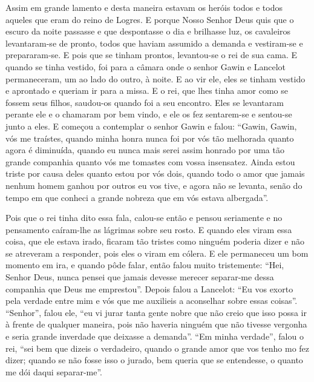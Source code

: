 Assim em grande lamento e desta maneira estavam os heróis todos e todos aqueles
que eram do reino de Logres. E porque Nosso Senhor Deus quis que o escuro da
noite passasse e que despontasse o dia e brilhasse luz, os cavaleiros
levantaram-se de pronto, todos que haviam assumido a demanda e vestiram-se e
prepararam-se. E pois que se tinham prontos, levantou-se o rei de sua cama. E
quando se tinha vestido, foi para a câmara onde o senhor Gawin e Lancelot
permaneceram, um ao lado do outro, à noite. E ao vir ele, eles se tinham
vestido e aprontado e queriam ir para a missa. E o rei, que lhes tinha amor
como se fossem seus filhos, saudou-os quando foi a seu encontro. Eles se
levantaram perante ele e o chamaram por bem vindo, e ele os fez sentarem-se e
sentou-se junto a eles. E começou a contemplar o senhor Gawin e falou: “Gawin,
Gawin, vós me traístes, quando minha honra nunca foi por vós tão melhorada
quanto agora é diminuída, quando eu nunca mais serei assim honrado por uma tão
grande companhia quanto vós me tomastes com vossa insensatez. Ainda estou
triste por causa deles quanto estou por vós dois, quando todo o amor que jamais
nenhum homem ganhou por outros eu vos tive, e agora não se levanta, senão do
tempo em que conheci a grande nobreza que em vós estava albergada”. 

Pois que o rei tinha dito essa fala, calou-se então e pensou seriamente e no
pensamento caíram-lhe as lágrimas sobre seu rosto. E quando eles viram essa
coisa, que ele estava irado, ficaram tão tristes como ninguém poderia dizer e
não se atreveram a responder, pois eles o viram em cólera. E ele permaneceu um
bom momento em ira, e quando pôde falar, então falou muito tristemente: “Hei,
Senhor Deus, nunca pensei que jamais devesse merecer separar-me dessa companhia
que Deus me emprestou”. Depois falou a Lancelot: “Eu vos exorto pela verdade
entre mim e vós que me auxilieis a aconselhar sobre essas coisas”. “Senhor”,
falou ele, “eu vi jurar tanta gente nobre que não creio que isso possa ir à
frente de qualquer maneira, pois não haveria ninguém que não tivesse vergonha e
seria grande inverdade que deixasse a demanda”. “Em minha verdade”,
falou o rei, “sei bem que dizeis o verdadeiro, quando o grande amor que vos
tenho mo fez dizer; quando se não fosse isso o jurado, bem queria que se
entendesse, o quanto me dói daqui separar-me”.

